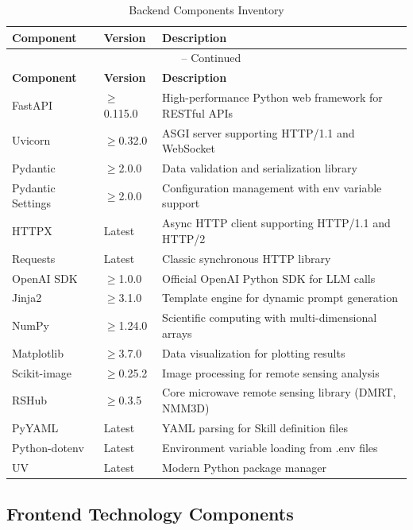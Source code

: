 \begin{longtable}{@{}p{3.5cm}p{2.5cm}p{7.5cm}@{}}
	\caption{Backend Components Inventory} \\
	\toprule
	\textbf{Component} & \textbf{Version} & \textbf{Description} \\
	\midrule
	\endfirsthead
	\multicolumn{3}{c}{\tablename\ \thetable{} -- Continued} \\
	\toprule
	\textbf{Component} & \textbf{Version} & \textbf{Description} \\
	\midrule
	\endhead
	\bottomrule
	\endfoot
	FastAPI & $\geq$0.115.0 & High-performance Python web framework for RESTful APIs \\
	Uvicorn & $\geq$0.32.0 & ASGI server supporting HTTP/1.1 and WebSocket \\
	Pydantic & $\geq$2.0.0 & Data validation and serialization library \\
	Pydantic Settings & $\geq$2.0.0 & Configuration management with env variable support \\
	HTTPX & Latest & Async HTTP client supporting HTTP/1.1 and HTTP/2 \\
	Requests & Latest & Classic synchronous HTTP library \\
	OpenAI SDK & $\geq$1.0.0 & Official OpenAI Python SDK for LLM calls \\
	Jinja2 & $\geq$3.1.0 & Template engine for dynamic prompt generation \\
	NumPy & $\geq$1.24.0 & Scientific computing with multi-dimensional arrays \\
	Matplotlib & $\geq$3.7.0 & Data visualization for plotting results \\
	Scikit-image & $\geq$0.25.2 & Image processing for remote sensing analysis \\
	RSHub & $\geq$0.3.5 & Core microwave remote sensing library (DMRT, NMM3D) \\
	PyYAML & Latest & YAML parsing for Skill definition files \\
	Python-dotenv & Latest & Environment variable loading from .env files \\
	UV & Latest & Modern Python package manager \\
\end{longtable}

\subsection{Frontend Technology Components}

